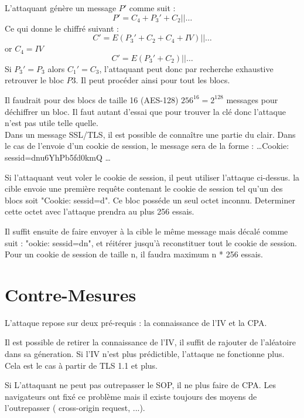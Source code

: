 L'attaquant génère un message $P'$ comme suit :
\[ P' = C_4 + P_3' + C_2 || \dots\]
Ce qui donne le chiffré suivant :
\[ C' = E(P_3' + C_2 + C_4 + IV) || \dots  \]
or $C_4 = IV$
\[ C' = E(P_3' + C_2) || \dots \]
Si $P_3' = P_3 $ alors $C_1' = C_3$, l'attaquant peut donc par recherche exhaustive retrouver le bloc $P3$. Il peut
procéder ainsi pour tout les blocs. 

Il faudrait pour des blocs de taille 16 (AES-128) $256^{16} = 2^{128}$ messages pour déchiffrer un bloc. Il faut autant
d'essai que pour trouver la clé donc l'attaque n'est pas utile telle quelle.\\ 

Dans un message SSL/TLS, il est possible de connaître une partie du clair. Dans le cas de l'envoie d'un cookie de 
session, le message sera de la forme : \dots Cookie: sessid=dnu6YhPb5fd0kmQ \dots

Si l'attaquant veut voler le cookie de session, il peut utiliser l'attaque ci-dessus. la cible envoie une première
requête contenant le cookie de session tel qu'un des blocs soit "Cookie: sessid=d". Ce bloc posséde un seul octet
inconnu. Determiner cette octet avec l'attaque prendra au plus 256 essais.

Il suffit ensuite de faire envoyer à la cible le même message mais décalé comme suit : "ookie: sessid=dn", et
réitérer jusqu'à reconstituer tout le cookie de session. Pour un cookie de session de taille n, il faudra maximum
n * 256 essais.

\section{Contre-Mesures}
\label{sec:cmBeast}

   L'attaque repose sur deux pré-requis : la connaissance de l'IV et la CPA. 

Il est possible de retirer la connaissance de l'IV, il suffit de rajouter de l'aléatoire dans sa géneration. 
Si l'IV n'est plus prédictible, l'attaque ne fonctionne plus. Cela est le cas à partir de TLS 1.1 et plus.

Si L'attaquant ne peut pas outrepasser le SOP, il ne plus faire de CPA. Les navigateurs ont fixé ce problème mais
il existe toujours des moyens de l'outrepasser ( cross-origin request, ...). 



